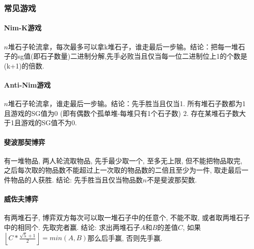 \begin{small}
\subsubsection{常见游戏}
\begin{multicols}{2}
\paragraph{Nim-K游戏}$n$堆石子轮流拿，每次最多可以拿k堆石子，谁走最后一步输。结论：把每一堆石子的sg值(即石子数量)二进制分解,先手必败当且仅当每一位二进制位上1的个数是(k+1)的倍数. 
\paragraph{Anti-Nim游戏}$n$堆石子轮流拿，谁走最后一步输。结论：先手胜当且仅当1. 所有堆石子数都为1且游戏的SG值为0 (即有偶数个孤单堆-每堆只有1个石子数) 2. 存在某堆石子数大于1且游戏的SG值不为0.
\paragraph{斐波那契博弈}有一堆物品, 两人轮流取物品, 先手最少取一个, 至多无上限, 但不能把物品取完, 之后每次取的物品数不能超过上一次取的物品数的二倍且至少为一件, 取走最后一件物品的人获胜. 结论: 先手胜当且仅当物品数$n$不是斐波那契数. 
\paragraph{威佐夫博弈}有两堆石子, 博弈双方每次可以取一堆石子中的任意个, 不能不取, 或者取两堆石子中的相同个. 先取完者赢. 结论: 求出两堆石子$A$和$B$的差值$C$, 如果$\left\lfloor C*\frac{\sqrt{5}+1}{2}\right\rfloor=min(A,B)$那么后手赢, 否则先手赢. 

\end{multicols}
\end{small}
